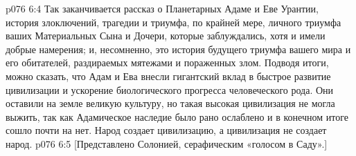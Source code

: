 \vs p076 6:4 \pc Так заканчивается рассказ о Планетарных Адаме и Еве Урантии, история злоключений, трагедии и триумфа, по крайней мере, личного триумфа ваших Материальных Сына и Дочери, которые заблуждались, хотя и имели добрые намерения; и, несомненно, это история будущего триумфа вашего мира и его обитателей, раздираемых мятежами и пораженных злом. Подводя итоги, можно сказать, что Адам и Ева внесли гигантский вклад в быстрое развитие цивилизации и ускорение биологического прогресса человеческого рода. Они оставили на земле великую культуру, но такая высокая цивилизация не могла выжить, так как Адамическое наследие было рано ослаблено и в конечном итоге сошло почти на нет. Народ создает цивилизацию, а цивилизация не создает народ.
\vsetoff
\vs p076 6:5 [Представлено Солонией, серафическим «голосом в Саду».]
